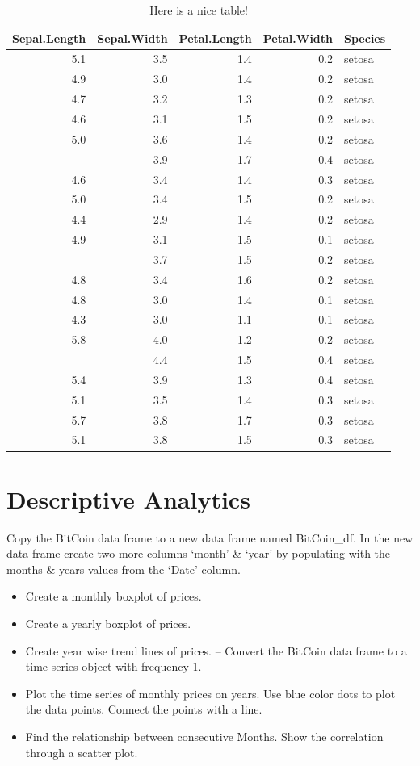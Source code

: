 \documentclass[
]{book}
\providecommand{\tightlist}{%
  \setlength{\itemsep}{0pt}\setlength{\parskip}{0pt}}
\begin{document}
\begin{table}

\caption{\label{tab:nice-tab}Here is a nice table!}
\centering
\begin{tabular}[t]{rrrrl}
\toprule
Sepal.Length & Sepal.Width & Petal.Length & Petal.Width & Species\\
\midrule
5.1 & 3.5 & 1.4 & 0.2 & setosa\\
4.9 & 3.0 & 1.4 & 0.2 & setosa\\
4.7 & 3.2 & 1.3 & 0.2 & setosa\\
4.6 & 3.1 & 1.5 & 0.2 & setosa\\
5.0 & 3.6 & 1.4 & 0.2 & setosa\\
\addlinespace
5.4 & 3.9 & 1.7 & 0.4 & setosa\\
4.6 & 3.4 & 1.4 & 0.3 & setosa\\
5.0 & 3.4 & 1.5 & 0.2 & setosa\\
4.4 & 2.9 & 1.4 & 0.2 & setosa\\
4.9 & 3.1 & 1.5 & 0.1 & setosa\\
\addlinespace
5.4 & 3.7 & 1.5 & 0.2 & setosa\\
4.8 & 3.4 & 1.6 & 0.2 & setosa\\
4.8 & 3.0 & 1.4 & 0.1 & setosa\\
4.3 & 3.0 & 1.1 & 0.1 & setosa\\
5.8 & 4.0 & 1.2 & 0.2 & setosa\\
\addlinespace
5.7 & 4.4 & 1.5 & 0.4 & setosa\\
5.4 & 3.9 & 1.3 & 0.4 & setosa\\
5.1 & 3.5 & 1.4 & 0.3 & setosa\\
5.7 & 3.8 & 1.7 & 0.3 & setosa\\
5.1 & 3.8 & 1.5 & 0.3 & setosa\\
\bottomrule
\end{tabular}
\end{table}

\chapter{Descriptive Analytics}\label{descriptive-analytics}

Copy the BitCoin data frame to a new data frame named BitCoin\_df. In the new data frame create two more columns `month' \& `year' by populating with the months \& years values from the `Date' column.

\begin{itemize}
\tightlist
\item
  Create a monthly boxplot of prices.
\item
  Create a yearly boxplot of prices.
\item
  Create year wise trend lines of prices.
  -- Convert the BitCoin data frame to a time series object with frequency 1.
\item
  Plot the time series of monthly prices on years. Use blue color dots to plot the data points. Connect the points with a line.
\item
  Find the relationship between consecutive Months. Show the correlation through a scatter plot.
\end{itemize}
\end{document}
